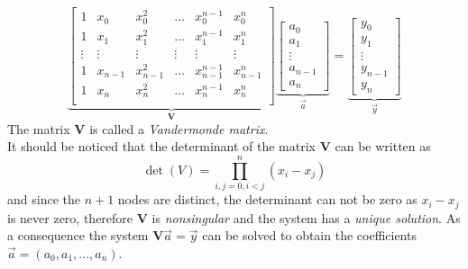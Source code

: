 \begin{equation*}
\underbrace{\begin{bmatrix}
1 & x_0 & x_0^2 & \dots & x_0^{n-1} & x_0^n \\
1 & x_1 & x_1^2 & \dots & x_1^{n-1} & x_1^n \\
\vdots & \vdots & \vdots & \vdots & \vdots & \vdots\\
1 & x_{n-1} & x_{n-1}^2 & \dots & x_{n-1}^{n-1} & x_{n-1}^n \\
1 & x_n & x_n^2 & \dots & x_n^{n-1} & x_n^n \\
\end{bmatrix}}_{\textbf{V}}
\underbrace{\begin{bmatrix}
a_0 \\
a_1 \\
\vdots \\
a_{n-1} \\
a_n
\end{bmatrix}}_{\vec{a}}
=
\underbrace{\begin{bmatrix}
y_0 \\
y_1 \\
\vdots \\
y_{n-1} \\
y_n
\end{bmatrix}}_{\vec{y}}
\end{equation*}
The matrix \textbf{V} is called a \textit{Vandermonde matrix}.\\
It should be noticed that the determinant of the matrix \textbf{V} can be written as
\[
\det(V) = \prod_{i,j=0,i<j}^{n}\left( x_i-x_j \right) 
\]
and since the $n+1$ nodes are distinct, the determinant can not be zero as $x_i - x_j$ is never zero, therefore \textbf{V} is \textit{nonsingular} and the system has a \textit{unique solution}. As a consequence the system $\textbf{V}\vec{a} = \vec{y}$ can be solved to obtain the coefficients $\vec{a} = (a_0, a_1, \dots , a_n)$.
